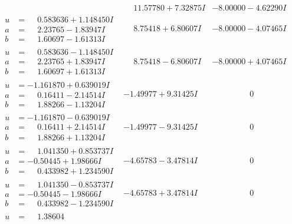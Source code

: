 \documentclass[1p]{elsarticle_modified}
\theoremstyle{definition}
\begin{document}
$$\begin{array}{c|c|c}
 & \phantom{-}11.57780 + 7.32875 I & -8.00000 - 4.62290 I \\ \hline\begin{aligned}
u &= \phantom{-}0.583636 + 1.148450 I \\
a &= \phantom{-}2.23765 - 1.83947 I \\
b &= \phantom{-}1.60697 - 1.61313 I\end{aligned}
 & \phantom{-}8.75418 + 6.80607 I & -8.00000 - 4.07465 I \\ \hline\begin{aligned}
u &= \phantom{-}0.583636 - 1.148450 I \\
a &= \phantom{-}2.23765 + 1.83947 I \\
b &= \phantom{-}1.60697 + 1.61313 I\end{aligned}
 & \phantom{-}8.75418 - 6.80607 I & -8.00000 + 4.07465 I \\ \hline\begin{aligned}
u &= -1.161870 + 0.639019 I \\
a &= \phantom{-}0.16411 - 2.14514 I \\
b &= \phantom{-}1.88266 - 1.13204 I\end{aligned}
 & -1.49977 + 9.31425 I & \phantom{-0.000000 } 0 \\ \hline\begin{aligned}
u &= -1.161870 - 0.639019 I \\
a &= \phantom{-}0.16411 + 2.14514 I \\
b &= \phantom{-}1.88266 + 1.13204 I\end{aligned}
 & -1.49977 - 9.31425 I & \phantom{-0.000000 } 0 \\ \hline\begin{aligned}
u &= \phantom{-}1.041350 + 0.853737 I \\
a &= -0.50445 + 1.98666 I \\
b &= \phantom{-}0.433982 + 1.234590 I\end{aligned}
 & -4.65783 - 3.47814 I & \phantom{-0.000000 } 0 \\ \hline\begin{aligned}
u &= \phantom{-}1.041350 - 0.853737 I \\
a &= -0.50445 - 1.98666 I \\
b &= \phantom{-}0.433982 - 1.234590 I\end{aligned}
 & -4.65783 + 3.47814 I & \phantom{-0.000000 } 0 \\ \hline\begin{aligned}
u &= \phantom{-}1.38604\phantom{ +0.000000I} \\

\end{aligned}
\end{array}$$
\end{document}
